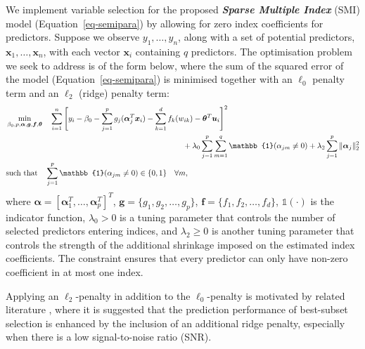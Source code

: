 \documentclass[
  11pt,
  a4paper,
]{article}
\begin{document}
We implement variable selection for the proposed \textbf{\emph{Sparse
Multiple Index}} (SMI) model (Equation~\ref{eq-semipara}) by allowing
for zero index coefficients for predictors. Suppose we observe
\(y_1,\dots,y_n\), along with a set of potential predictors,
\(\bm{x}_1,\dots,\bm{x}_n\), with each vector \(\bm{x}_i\) containing
\(q\) predictors. The optimisation problem we seek to address is of the
form below, where the sum of the squared error of the model
(Equation~\ref{eq-semipara}) is minimised together with an \(\ell_{0}\)
penalty term and an \(\ell_{2}\) (ridge) penalty term: \begin{align}
  & \min_{\beta_{0}, p, \bm{\alpha}, \bm{g}, \bm{f}, \bm{\theta}} \quad \sum_{i = 1}^{n}\Bigg [ y_{i} - \beta_{0} - \sum_{j = 1}^{p}g_{j}(\bm{\alpha}_{j}^{T}\bm{x}_{i}) - \sum_{k = 1}^{d}f_{k}(w_{ik}) - \bm{\theta}^{T}\bm{u}_{i}\Bigg]^{2} \label{eq-smi}\\
  & \hspace*{8cm} + \lambda_{0}\sum_{j = 1}^{p}\sum_{m = 1}^{q}\mathbb{1}(\alpha_{jm} \neq 0) + \lambda_{2}\sum_{j = 1}^{p}\|\bm{\alpha}_{j}\|_2^2 \nonumber \\
  & \text{such that}\quad \sum_{j=1}^p \mathbb{1}(\alpha_{jm} \neq 0) \in \{0,1\} \quad \forall m ,\nonumber
\end{align} where
\(\bm{\alpha} = [\bm{\alpha}_{1}^{T}, \dots, \bm{\alpha}_{p}^{T} ]^{T}\),
\(\bm{g} = \{g_{1}, g_{2}, \dots, g_{p}\}\),
\(\bm{f} = \{f_{1}, f_{2}, \dots, f_{d}\}\), \(\mathbb{1}(\cdot)\) is
the indicator function, \(\lambda_{0} > 0\) is a tuning parameter that
controls the number of selected predictors entering indices, and
\(\lambda_{2} \ge 0\) is another tuning parameter that controls the
strength of the additional shrinkage imposed on the estimated index
coefficients. The constraint ensures that every predictor can only have
non-zero coefficient in at most one index.

Applying an \(\ell_{2}\)-penalty in addition to the \(\ell_{0}\)-penalty
is motivated by related literature
\autocite{Hazimeh2020,Mazumder2023,Hazimeh2023}, where it is suggested
that the prediction performance of best-subset selection is enhanced by
the inclusion of an additional ridge penalty, especially when there is a
low signal-to-noise ratio (SNR).
\end{document}

